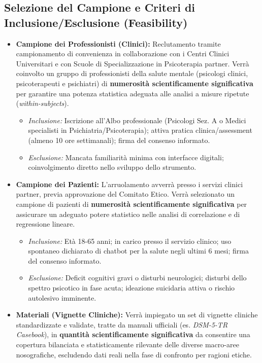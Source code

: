 \documentclass[11pt,a4paper]{article}
\begin{document}
\subsection{Selezione del Campione e Criteri di Inclusione/Esclusione (Feasibility)}
\begin{itemize}
    \item \textbf{Campione dei Professionisti (Clinici):} Reclutamento tramite campionamento di convenienza in collaborazione con i Centri Clinici Universitari e con Scuole di Specializzazione in Psicoterapia partner. Verrà coinvolto un gruppo di professionisti della salute mentale (psicologi clinici, psicoterapeuti e psichiatri) di \textbf{numerosità scientificamente significativa} per garantire una potenza statistica adeguata alle analisi a misure ripetute (\textit{within-subjects}).
    \begin{itemize}
        \item \textit{Inclusione:} Iscrizione all'Albo professionale (Psicologi Sez. A o Medici specialisti in Psichiatria/Psicoterapia); attiva pratica clinica/assessment (almeno 10 ore settimanali); firma del consenso informato.
        \item \textit{Esclusione:} Mancata familiarità minima con interfacce digitali; coinvolgimento diretto nello sviluppo dello strumento.
    \end{itemize}
    
    \item \textbf{Campione dei Pazienti:} L'arruolamento avverrà presso i servizi clinici partner, previa approvazione del Comitato Etico. Verrà selezionato un campione di pazienti di \textbf{numerosità scientificamente significativa} per assicurare un adeguato potere statistico nelle analisi di correlazione e di regressione lineare.
    \begin{itemize}
        \item \textit{Inclusione:} Età 18-65 anni; in carico presso il servizio clinico; uso spontaneo dichiarato di chatbot per la salute negli ultimi 6 mesi; firma del consenso informato.
        \item \textit{Esclusione:} Deficit cognitivi gravi o disturbi neurologici; disturbi dello spettro psicotico in fase acuta; ideazione suicidaria attiva o rischio autolesivo imminente.
    \end{itemize}
    
    \item \textbf{Materiali (Vignette Cliniche):} Verrà impiegato un set di vignette cliniche standardizzate e validate, tratte da manuali ufficiali (es. \textit{DSM-5-TR Casebook}), in \textbf{quantità scientificamente significativa} da consentire una copertura bilanciata e statisticamente rilevante delle diverse macro-aree nosografiche, escludendo dati reali nella fase di confronto per ragioni etiche.
\end{itemize}
\end{document}
